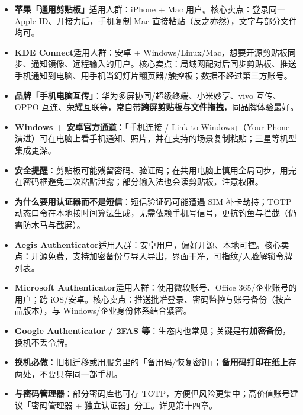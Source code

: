 \begin{itemize}
  \item \textbf{苹果「通用剪贴板」}适用人群：iPhone + Mac 用户。核心卖点：登录同一 Apple ID、开接力后，手机复制 Mac 直接粘贴（反之亦然），文字与部分文件均可。
  \item \textbf{KDE Connect}适用人群：安卓 + Windows/Linux/Mac，想要开源剪贴板同步、通知镜像、远程输入的用户。核心卖点：局域网配对后同步剪贴板、推送手机通知到电脑、用手机当幻灯片翻页器/触控板；数据不经过第三方账号。
  \item \textbf{品牌「手机电脑互传」}：华为多屏协同/超级终端、小米妙享、vivo 互传、OPPO 互连、荣耀互联等，常自带\textbf{跨屏剪贴板与文件拖拽}，同品牌体验最好。
  \item \textbf{Windows + 安卓官方通道}：「手机连接 / Link to Windows」（Your Phone 演进）可在电脑上看手机通知、照片，并在支持的场景复制粘贴；三星等机型集成更深。
  \item \textbf{安全提醒}：剪贴板可能残留密码、验证码；在共用电脑上慎用全局同步，用完在密码框避免二次粘贴泄露；部分输入法也会读剪贴板，注意权限。
\end{itemize}


\begin{itemize}
  \item \textbf{为什么要用认证器而不是短信}：短信验证码可能遭遇 SIM 补卡劫持；TOTP 动态口令在本地按时间算法生成，无需依赖手机号信号，更抗钓鱼与拦截（仍需防木马与截屏）。
  \item \textbf{Aegis Authenticator}适用人群：安卓用户，偏好开源、本地可控。核心卖点：开源免费，支持加密备份与导入导出，界面干净，可指纹/人脸解锁令牌列表。
  \item \textbf{Microsoft Authenticator}适用人群：使用微软账号、Office 365/企业账号的用户；跨 iOS/安卓。核心卖点：推送批准登录、密码监控与账号备份（按产品版本），与 Windows/企业身份体系结合紧密。
  \item \textbf{Google Authenticator / 2FAS 等}：生态内也常见；关键是有\textbf{加密备份}，换机不丢令牌。
  \item \textbf{换机必做}：旧机迁移或用服务里的「备用码/恢复密钥」；\textbf{备用码打印在纸上}存两处，不要只存同一部手机。
  \item \textbf{与密码管理器}：部分密码库也可存 TOTP，方便但风险更集中；高价值账号建议「密码管理器 + 独立认证器」分工。详见第十四章。
\end{itemize}


